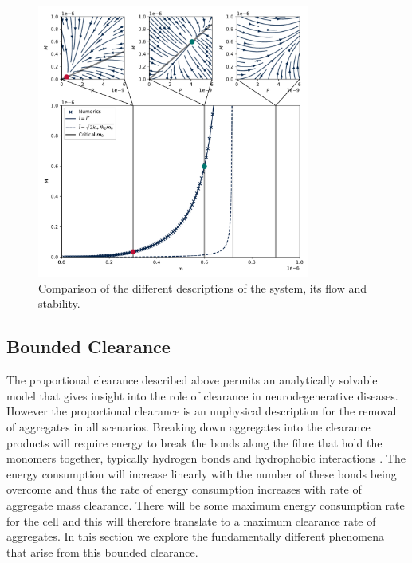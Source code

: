 \begin{figure}
    \centering
    \includegraphics[width=0.8\textwidth]{figures/4-agg-figs/propClearSummary.pdf}
    \caption{Comparison of the different descriptions of the system, its flow and stability.}
    \label{fig:4-steadyConstClear}
\end{figure}

\subsection{Bounded Clearance}\label{subsec:4-boundedclearance}

The proportional clearance described above permits an analytically solvable model that gives insight into the role of clearance in neurodegenerative diseases. However the proportional clearance is an unphysical description for the removal of aggregates in all scenarios. Breaking down aggregates into the clearance products will require energy to break the bonds along the fibre that hold the monomers together, typically hydrogen bonds and hydrophobic interactions \cite{chiti_protein_2017}. The energy consumption will increase linearly with the number of these bonds being overcome and thus the rate of energy consumption increases with rate of aggregate mass clearance. There will be some maximum energy consumption rate for the cell and this will therefore translate to a maximum clearance rate of aggregates. In this section we explore the fundamentally different phenomena that arise from this bounded clearance.

